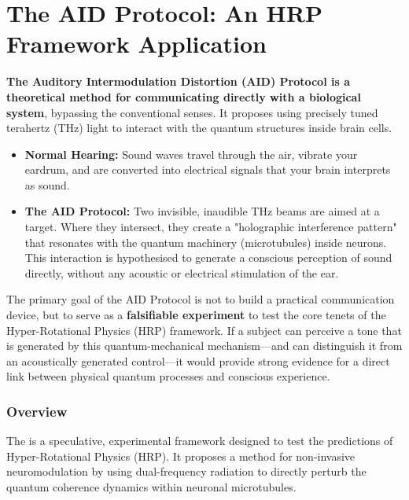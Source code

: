 
\chapter{The AID Protocol: An HRP Framework Application}
\label{ch:aid-protocol}

\begin{nontechnical}
    \textbf{The Auditory Intermodulation Distortion (AID) Protocol is a theoretical method for communicating directly with a biological system}, bypassing the conventional senses. It proposes using precisely tuned terahertz (THz) light to interact with the quantum structures inside brain cells.

    \begin{itemize}
        \item \textbf{Normal Hearing:} Sound waves travel through the air, vibrate your eardrum, and are converted into electrical signals that your brain interprets as sound.
        \item \textbf{The AID Protocol:} Two invisible, inaudible THz beams are aimed at a target. Where they intersect, they create a "holographic interference pattern" that resonates with the quantum machinery (microtubules) inside neurons. This interaction is hypothesised to generate a conscious perception of sound directly, without any acoustic or electrical stimulation of the ear.
    \end{itemize}

    The primary goal of the AID Protocol is not to build a practical communication device, but to serve as a \textbf{falsifiable experiment} to test the core tenets of the Hyper-Rotational Physics (HRP) framework. If a subject can perceive a tone that is generated by this quantum-mechanical mechanism—and can distinguish it from an acoustically generated control—it would provide strong evidence for a direct link between physical quantum processes and conscious experience.
\end{nontechnical}


\subsection{Overview}

The  is a speculative, experimental framework designed to test the predictions of Hyper-Rotational Physics (HRP). It proposes a method for non-invasive neuromodulation by using dual-frequency  radiation to directly perturb the quantum coherence dynamics within neuronal microtubules.

